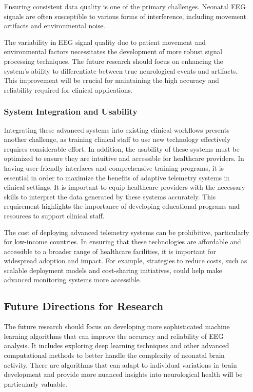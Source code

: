 \documentclass[12pt,journal,compsoc]{IEEEtran}
\begin{document}
Ensuring consistent data quality is one of the primary challenges. Neonatal EEG signals are often susceptible to various forms of interference, including movement artifacts and environmental noise. 

The variability in EEG signal quality due to patient movement and environmental factors necessitates the development of more robust signal processing techniques. The future research should focus on enhancing the system's ability to differentiate between true neurological events and artifacts. This improvement will be crucial for maintaining the high accuracy and reliability required for clinical applications.

\subsubsection{System Integration and Usability}

Integrating these advanced systems into existing clinical workflows presents another challenge, as training clinical staff to use new technology effectively requires considerable effort. In addition, the usability of these systems must be optimized to ensure they are intuitive and accessible for healthcare providers. In having user-friendly interfaces and comprehensive training programs, it is essential in order to maximize the benefits of adaptive telemetry systems in clinical settings. It is important to equip healthcare providers with the necessary skills to interpret the data generated by these systems accurately. This requirement highlights the importance of developing educational programs and resources to support clinical staff.  

The cost of deploying advanced telemetry systems can be prohibitive, particularly for low-income countries. In ensuring that these technologies are affordable and accessible to a broader range of healthcare facilities, it is important for widespread adoption and impact. For example, strategies to reduce costs, such as scalable deployment models and cost-sharing initiatives, could help make advanced monitoring systems more accessible.

\subsection{Future Directions for Research}

The future research should focus on developing more sophisticated machine learning algorithms that can improve the accuracy and reliability of EEG analysis. It includes exploring deep learning techniques and other advanced computational methods to better handle the complexity of neonatal brain activity. There are algorithms that can adapt to individual variations in brain development and provide more nuanced insights into neurological health will be particularly valuable.
\end{document}
